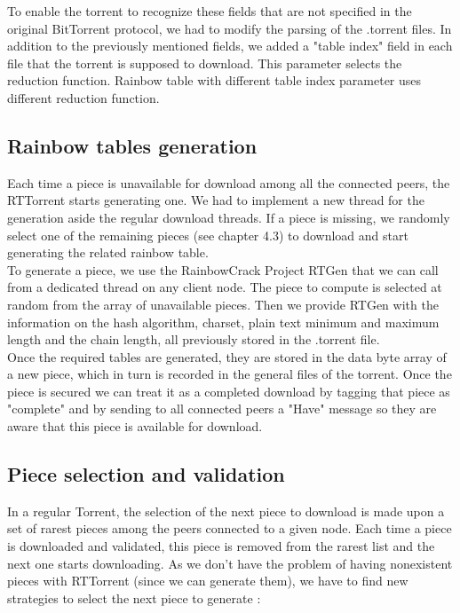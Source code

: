 \documentclass[a4paper]{article}
\begin{document}
{To enable the torrent to recognize these fields that are not specified in the original BitTorrent protocol, we had to modify the parsing of the .torrent files. In addition to the previously mentioned fields, we added a "table index" field in each file that the torrent is supposed to download. This parameter selects the reduction function. Rainbow table with different table index parameter uses different reduction function.

\subsection{Rainbow tables generation}

Each time a piece is unavailable for download among all the connected peers, the RTTorrent starts generating one. We had to implement a new thread for the generation aside the regular download threads. If a piece is missing, we randomly select one of the remaining pieces (see chapter 4.3) to download and start generating the related rainbow table.\\

To generate a piece, we use the RainbowCrack Project RTGen that we can call from a dedicated thread on any client node. The piece to compute is selected at random from the array of unavailable pieces. Then we provide RTGen with the information on the hash algorithm, charset, plain text minimum and maximum length and the chain length, all previously stored in the .torrent file.\\

Once the required tables are generated, they are stored in the data byte array of a new piece, which in turn is recorded in the general files of the torrent. Once the piece is secured we can treat it as a completed download by tagging that piece as "complete" and by sending to all connected peers a "Have" message so they are aware that this piece is available for download.

\subsection{Piece selection and validation}
In a regular Torrent, the selection of the next piece to download is made upon a set of rarest pieces among the peers connected to a given node. Each time a piece is downloaded and validated, this piece is removed from the rarest list and the next one starts downloading. As we don't have the problem of having nonexistent pieces with RTTorrent (since we can generate them), we have to find new strategies to select the next piece to generate :\vspace{2mm}

}
\end{document}
